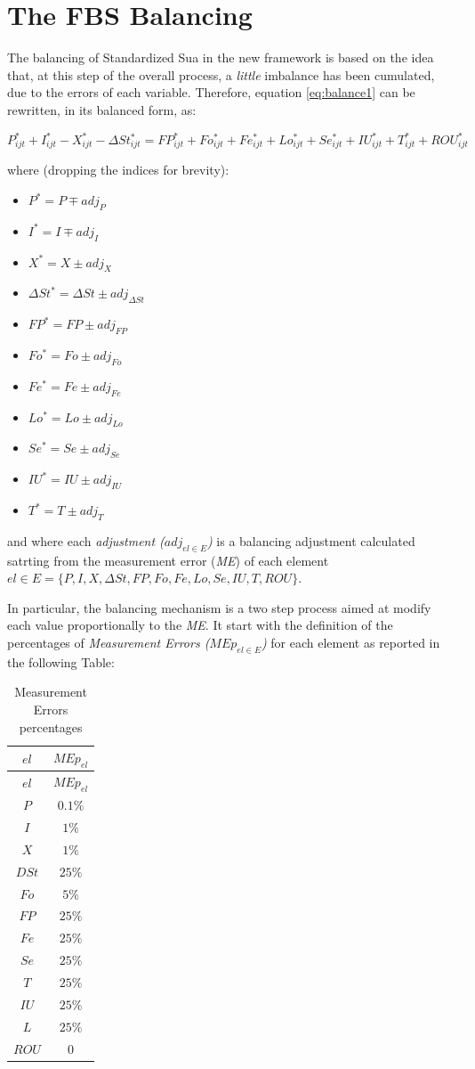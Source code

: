 \documentclass[]{article}
\providecommand{\tightlist}{%
  \setlength{\itemsep}{0pt}\setlength{\parskip}{0pt}}
\begin{document}
\section{The FBS Balancing}\label{the-fbs-balancing}

The balancing of Standardized Sua in the new framework is based on the
idea that, at this step of the overall process, a \emph{little}
imbalance has been cumulated, due to the errors of each variable.
Therefore, equation \ref{eq:balance1} can be rewritten, in its balanced
form, as:

\begin{equation}
\label{eq:balance3}
P^*_{ijt} + I^*_{ijt} - X^*_{ijt} - \Delta St^*_{ijt} = FP^*_{ijt} + Fo^*_{ijt} + Fe^*_{ijt} + Lo^*_{ijt} + Se^*_{ijt} + IU^*_{ijt} + T^*_{ijt}  + ROU^*_{ijt}
\end{equation}

where (dropping the indices for brevity):

\begin{itemize}
\tightlist
\item
  \(P^* = P \mp adj_{P}\)
\item
  \(I^* = I \mp adj_{I}\)
\item
  \(X^* = X \pm adj_{X}\)
\item
  \(\Delta St^* = \Delta St \pm adj_{\Delta St}\)
\item
  \(FP^* = FP \pm adj_{FP}\)
\item
  \(Fo^* = Fo \pm adj_{Fo}\)
\item
  \(Fe^* = Fe \pm adj_{Fe}\)
\item
  \(Lo^* = Lo \pm adj_{Lo}\)
\item
  \(Se^* = Se \pm adj_{Se}\)
\item
  \(IU^* = IU \pm adj_{IU}\)
\item
  \(T^* = T \pm adj_{T}\)
\end{itemize}

and where each \emph{adjustment (\(adj_{el \in E}\))} is a balancing
adjustment calculated satrting from the measurement error (\emph{ME}) of
each element
\(el \in E = \{P,I,X,\Delta St, FP,Fo,Fe,Lo,Se,IU,T,ROU\}\).

In particular, the balancing mechanism is a two step process aimed at
modify each value proportionally to the \emph{ME}. It start with the
definition of the percentages of \emph{Measurement Errors
(\(MEp_{el \in E}\))} for each element as reported in the following
Table:

\begin{longtable}[]{@{}cc@{}}
\caption{Measurement Errors percentages}\tabularnewline
\toprule
\(el\) & \(MEp_{el}\)\tabularnewline
\midrule
\endfirsthead
\toprule
\(el\) & \(MEp_{el}\)\tabularnewline
\midrule
\endhead
\(P\) & \(0.1\%\)\tabularnewline
\(I\) & \(1\%\)\tabularnewline
\(X\) & \(1\%\)\tabularnewline
\(DSt\) & \(25\%\)\tabularnewline
\(Fo\) & \(5\%\)\tabularnewline
\(FP\) & \(25\%\)\tabularnewline
\(Fe\) & \(25\%\)\tabularnewline
\(Se\) & \(25\%\)\tabularnewline
\(T\) & \(25\%\)\tabularnewline
\(IU\) & \(25\%\)\tabularnewline
\(L\) & \(25\%\)\tabularnewline
\(ROU\) & \(0\)\tabularnewline
\bottomrule
\end{longtable}
\end{document}
